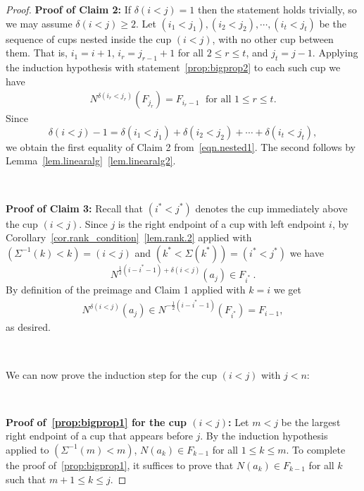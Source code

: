 \documentclass[11pt]{amsart}
\theoremstyle{remark}
\theoremstyle{remark}
\theoremstyle{definition}
\theoremstyle{definition}
\theoremstyle{definition}
\numberwithin{equation}{section}
\newcommand{\gd}{\delta}
\newcommand{\E}{\Sigma}
\begin{document}
\begin{proof}
\textbf{Proof of Claim 2:} If $\gd(i<j)=1$ then the statement holds trivially, so we may assume $\gd(i<j)\geq 2$. Let $(i_1<j_1),(i_2<j_2),\cdots,(i_t<j_t)$ be the sequence of cups nested inside the cup $(i<j)$, with no other cup between them. That is, $i_1=i+1$, $i_r = j_{r-1}+1$ for all $2\leq r \leq t$, and $j_t=j-1$. 
Applying the induction hypothesis with statement~\eqref{prop:bigprop2} to each such cup we have
\begin{eqnarray}\label{eqn.nested1}
N^{\gd(i_r<j_r)}(F_{j_r})=F_{i_r-1} \; \text{ for all } 1\leq r \leq t.
\end{eqnarray}
Since
\[
\gd(i<j)-1=\gd(i_1<j_1)+\gd(i_2<j_2)+\cdots+\gd(i_t<j_t),
\] 
we obtain the first equality of Claim 2 from~\eqref{eqn.nested1}. The second follows by Lemma~\ref{lem.linearalg}~\eqref{lem.linearalg2}.


\

\textbf{Proof of Claim 3:} Recall that $(i^*<j^*)$ denotes the cup immediately above the cup $(i<j)$.
Since $j$ is the right endpoint of a cup with left endpoint $i$, by Corollary~\ref{cor.rank_condition}~\eqref{lem.rank.2} applied with $(\E^{-1}(k)<k )= (i<j)$ and $(k^*<\E(k^*)) = (i^*<j^*)$ we have
\[
N^{\frac{1}{2}(i-i^*-1)+\gd(i<j)}(a_j) \in F_{i^*}\ .
\]
By definition of the preimage and Claim 1 applied with $k=i$ we get
\begin{eqnarray*}
N^{\gd(i<j)} (a_j) \in N^{-\frac{1}{2}(i-i^*-1)}\left(F_{i^*}\right) = F_{i-1},
\end{eqnarray*}
as desired.



\

We can now prove the induction step for the cup $(i<j)$ with $j<n$:

\

\textbf{Proof of~\eqref{prop:bigprop1} for the cup $(i<j)$:}
Let $m<j$ be the largest right endpoint of a cup that appears before $j$. By the induction hypothesis applied to $(\E^{-1}(m)<m)$, $N(a_k)\in F_{k-1}$ for all $1\leq k \leq m$. To complete the proof of~\eqref{prop:bigprop1}, it suffices to prove that $N(a_k)\in F_{k-1}$ for all $k$ such that $m+1\leq k \leq j$. 


\end{proof}
\end{document}
